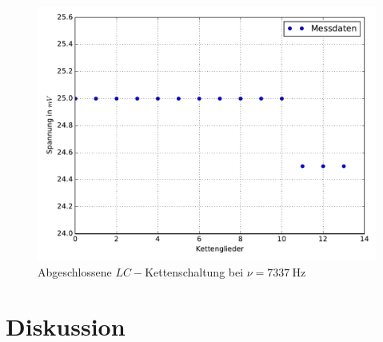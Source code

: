 \begin{figure}
  \includegraphics[width=\textwidth]{Messung_e.pdf}
  \caption{Abgeschlossene $LC-$Kettenschaltung bei $\nu = \SI{7337}{\hertz}$}
  \label{fig:Messunge}
\end{figure}

\section{Diskussion}

